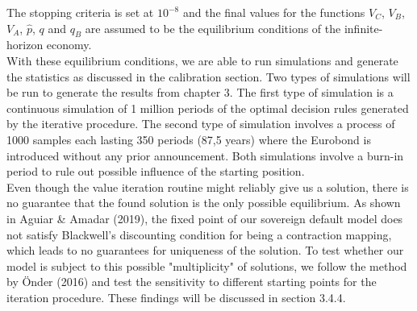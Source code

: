 The stopping criteria is set at $10^{-8}$ and the final values for the functions $V_C$, $V_B$, $V_A$, $\hat{p}$, $q$ and $q_B$ are assumed to be the equilibrium conditions of the infinite-horizon economy.\\

With these equilibrium conditions, we are able to run simulations and generate the statistics as discussed in the calibration section. Two types of simulations will be run to generate the results from chapter 3. The first type of simulation is a continuous simulation of 1 million periods of the optimal decision rules generated by the iterative procedure. The second type of simulation involves a process of 1000 samples each lasting 350 periods (87,5 years) where the Eurobond is introduced without any prior announcement. Both simulations involve a burn-in period to rule out possible influence of the starting position.\\

Even though the value iteration routine might reliably give us a solution, there is no guarantee that the found solution is the only possible equilibrium. As shown in Aguiar \& Amadar (2019), the fixed point of our sovereign default model does not satisfy Blackwell's discounting condition for being a contraction mapping, which leads to no guarantees for uniqueness of the solution. To test whether our model is subject to this possible "multiplicity" of solutions, we follow the method by Önder (2016) and test the sensitivity to different starting points for the iteration procedure. These findings will be discussed in section 3.4.4.\\